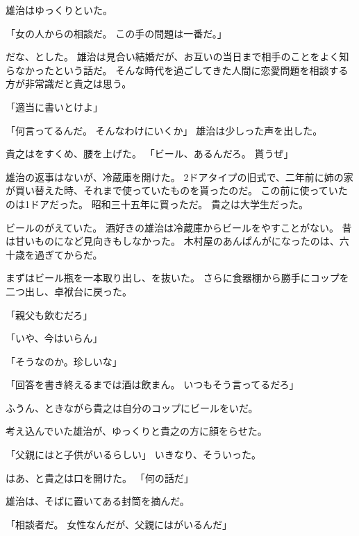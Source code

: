 \documentclass[chapter3.tex]{subfiles}
\begin{document}
\begin{CJK}{UTF8}{ipxm}
    雄治はゆっくりといた。
    
    「女の人からの相談だ。
    この手の問題は一番だ。」
    
    だな、とした。
    雄治は見合い結婚だが、お互いの当日まで相手のことをよく知らなかったという話だ。
    そんな時代を過ごしてきた人間に恋愛問題を相談する方が非常識だと貴之は思う。

    「適当に書いとけよ」

    「何言ってるんだ。
    そんなわけにいくか」
    雄治は少しった声を出した。

    貴之はをすくめ、腰を上げた。
    「ビール、あるんだろ。
    貰うぜ」

    雄治の返事はないが、冷蔵庫を開けた。
    2ドアタイプの旧式で、二年前に姉の家が買い替えた時、それまで使っていたものを貰ったのだ。
    この前に使っていたのは1ドアだった。
    昭和三十五年に買っただ。
    貴之は大学生だった。
    
    ビールのがえていた。
    酒好きの雄治は冷蔵庫からビールをやすことがない。
    昔は甘いものになど見向きもしなかった。
    木村屋のあんぱんがになったのは、六十歳を過ぎてからだ。

    まずはビール瓶を一本取り出し、を抜いた。
    さらに食器棚から勝手にコップを二つ出し、卓袱台に戻った。

    「親父も飲むだろ」

    「いや、今はいらん」

    「そうなのか。珍しいな」

    「回答を書き終えるまでは酒は飲まん。
    いつもそう言ってるだろ」

    ふうん、ときながら貴之は自分のコップにビールをいだ。
    
    考え込んでいた雄治が、ゆっくりと貴之の方に顔をらせた。

    「父親にはと子供がいるらしい」
    いきなり、そういった。

    はあ、と貴之は口を開けた。
    「何の話だ」

    雄治は、そばに置いてある封筒を摘んだ。

    「相談者だ。
    女性なんだが、父親にはがいるんだ」


\end{CJK}
\end{document}
